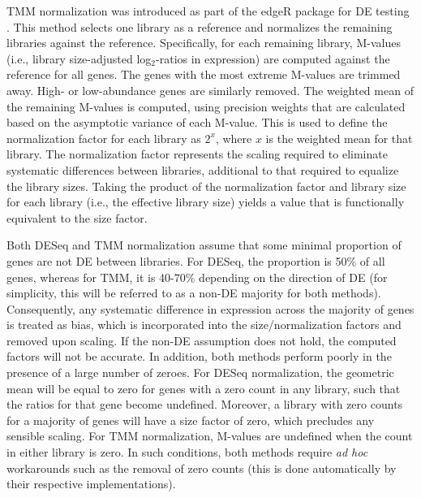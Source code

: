 \documentclass{bmcart}
\begin{document}
TMM normalization was introduced as part of the edgeR package for DE testing \cite{robinson2010edgeR}.
This method selects one library as a reference and normalizes the remaining libraries against the reference.
Specifically, for each remaining library, M-values (i.e., library size-adjusted log$_2$-ratios in expression) are computed against the reference for all genes.
The genes with the most extreme M-values are trimmed away.
High- or low-abundance genes are similarly removed.
The weighted mean of the remaining M-values is computed, using precision weights that are calculated based on the asymptotic variance of each M-value.
This is used to define the normalization factor for each library as $2^x$, where $x$ is the weighted mean for that library.
The normalization factor represents the scaling required to eliminate systematic differences between libraries, additional to that required to equalize the library sizes.
Taking the product of the normalization factor and library size for each library (i.e., the effective library size) yields a value that is functionally equivalent to the size factor.

Both DESeq and TMM normalization assume that some minimal proportion of genes are not DE between libraries.
For DESeq, the proportion is 50\% of all genes, whereas for TMM, it is 40-70\% depending on the direction of DE \cite{robinson2010scaling} (for simplicity, this will be referred to as a non-DE majority for both methods).
Consequently, any systematic difference in expression across the majority of genes is treated as bias, which is incorporated into the size/normalization factors and removed upon scaling.
If the non-DE assumption does not hold, the computed factors will not be accurate.
In addition, both methods perform poorly in the presence of a large number of zeroes.
For DESeq normalization, the geometric mean will be equal to zero for genes with a zero count in any library, such that the ratios for that gene become undefined.
Moreover, a library with zero counts for a majority of genes will have a size factor of zero, which precludes any sensible scaling.
For TMM normalization, M-values are undefined when the count in either library is zero.
In such conditions, both methods require \textit{ad hoc} workarounds such as the removal of zero counts (this is done automatically by their respective implementations).
\end{document}
